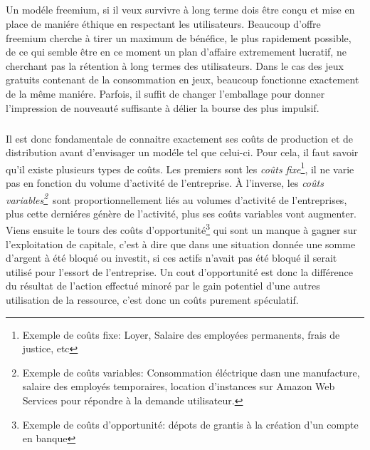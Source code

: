 \documentclass[11pt, a4paper ]{article}
\begin{document}
\subparagraph{}
Un modéle freemium, si il veux survivre à long terme dois être conçu et mise en place de maniére éthique\cite{ethicalF2P} en respectant les utilisateurs. Beaucoup d'offre freemium cherche à tirer un maximum de bénéfice, le plus rapidement possible, de ce qui semble être en ce moment un plan d'affaire extremement lucratif, ne cherchant pas la rétention à long termes des utilisateurs. Dans le cas des jeux gratuits contenant de la consommation en jeux, beaucoup fonctionne exactement de la même maniére. Parfois, il suffit de changer l'emballage pour donner l'impression de nouveauté suffisante à délier la bourse des plus impulsif.
\subparagraph{}
Il est donc fondamentale de connaitre exactement ses coûts de production et de distribution avant d'envisager un modéle tel que celui-ci. Pour cela, il faut savoir qu'il existe plusieurs types de coûts.
Les premiers sont les \emph{coûts fixe}\footnote{Exemple de coûts fixe: Loyer, Salaire des employées permanents, frais de justice, etc}\cite{defCoutFixeEtVar}, il ne varie pas en fonction du volume d'activité de l'entreprise.
À l'inverse, les \emph{coûts variables\footnote{Exemple de coûts variables: Consommation éléctrique dasn une manufacture, salaire des employés temporaires, location d'instances sur Amazon Web Services pour répondre à la demande utilisateur.}\cite{defCoutFixeEtVar}}\ sont proportionnellement liés au volumes d'activité de l'entreprises, plus cette derniéres génère de l'activité, plus ses coûts variables vont augmenter.
Viens ensuite le tours des coûts d'opportunité\footnote{Exemple de coûts d'opportunité: dépots de grantis à la création d'un compte en banque }\cite{defCoutOpp} qui sont un manque à gagner sur l'exploitation de capitale, c'est à dire que dans une situation donnée une somme d'argent à été bloqué ou investit, si ces actifs n'avait pas été bloqué il serait utilisé pour l'essort de l'entreprise. Un cout d'opportunité est donc la différence du résultat de l'action effectué minoré par le gain potentiel d'une autres utilisation de la ressource, c'est donc un coûts purement spéculatif.
\end{document}
